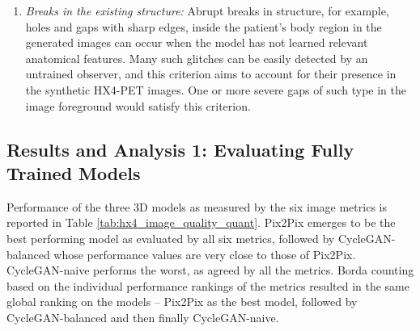 \begin{enumerate}
    \item \textit{Breaks in the existing structure:} Abrupt breaks in structure, for example, holes and gaps with sharp edges, inside the patient's body region in the generated images can occur when the model has not learned relevant anatomical features. Many such glitches can be easily detected by an untrained observer, and this criterion aims to account for their presence in the synthetic HX4-PET images. One or more severe gaps of such type in the image foreground would satisfy this criterion.
\end{enumerate}



\subsection{Results and Analysis 1: Evaluating Fully Trained Models}
Performance of the three 3D models as measured by the six image metrics is reported in Table \ref{tab:hx4_image_quality_quant}. Pix2Pix emerges to be the best performing model as evaluated by all six metrics, followed by CycleGAN-balanced whose performance values are very close to those of Pix2Pix. CycleGAN-naive performs the worst, as agreed by all the metrics. Borda counting based on the individual performance rankings of the metrics resulted in the same global ranking on the models -- Pix2Pix as the best model, followed by CycleGAN-balanced and then finally CycleGAN-naive.

\begin{table}[h!]
    \scriptsize
    \centering
    \caption{Performance on the Maastro Lung HX4-PET validation set. Best and second-to-best values are highlighted with bold and italics font, respectively. Performance of the unpaired CycleGAN-balanced model reaches close to that of the paired Pix2Pix model.}
    \label{tab:hx4_image_quality_quant}
\end{table}


